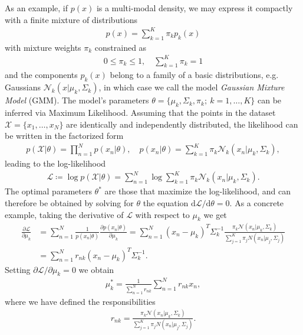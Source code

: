 As an example, if $p(x)$ is a multi-modal density, we may express it compactly with a finite mixture of  distributions
%
\begin{align}
p(x) = \sum_{k=1}^{K} \pi_{k} p_{k}(x)
\end{align}
%
with mixture weights $\pi_{k}$ constrained as
%
\begin{align}
0 \leq \pi_k \leq 1, \quad \sum_{k=1}^{K} \pi_{k} = 1
\end{align}
%
and the components $p_{k}(x)$ belong to a family of a basic distributions, e.g. Gaussians $\mathcal{N}_k(x | \mu_k, \Sigma_k)$, in which case we call the model \textit{Gaussian Mixture Model} (GMM). The model's parameters $\theta = \{ \mu_k, \Sigma_k, \pi_k; ~ k = 1, \ldots, K \}$ can be inferred via Maximum Likelihood. Assuming that the points in the dataset $\mathcal{X} = \{x_1, \ldots , x_N \}$ are identically and independently distributed, the likelihood can be written in the factorized form
%
\begin{align}
p(\mathcal{X} | \theta ) = \prod_{n=1}^N p(x_n | \theta), \quad p(x_n | \theta) = \sum_{k=1}^K \pi_k \mathcal{N}_k(x_n | \mu_k, \Sigma_k),
\end{align}
%
leading to the log-likelihood
%
\begin{align}
\mathcal{L} \coloneqq \log p(\mathcal{X} | \theta ) = \sum_{n=1}^N \log \sum_{k=1}^K \pi_k \mathcal{N}_k(x_n | \mu_k, \Sigma_k).
\end{align}
%
The optimal parameters $\theta^{*}$ are those that maximize the log-likelihood, and can therefore be obtained by solving for $\theta$ the equation $\text{d} \mathcal{L} / \text{d}\theta = 0$.
As a concrete example, taking the derivative of $\mathcal{L}$ with respect to $\mu_{k}$ we get
%
\begin{align}
\frac{\partial \mathcal{L}}{\partial \mu_k} &= \sum_{n=1}^{N} \frac{1}{p(x_n | \theta)} \frac{\partial p(x_n | \theta) }{\partial \mu_k} = \sum_{n=1}^{N} (x_n - \mu_k)^{T} \Sigma_k^{-1} \frac{\pi_k \mathcal{N}(x_n | \mu_k, \Sigma_k)}{\sum_{j=1}^{K} \pi_j N(x_n | \mu_j, \Sigma_j) } \\
&= \sum_{n=1}^{N} r_{nk} (x_n - \mu_k)^{T} \Sigma_k^{-1} .
\end{align}
%
Setting $\partial \mathcal{L} / \partial \mu_k  = 0$ we obtain
%
\begin{align}
\mu_k^{*} = \frac{1}{ \sum_{n=1}^{N} r_{nk}} \sum_{n=1}^{N} r_{nk} x_n,
\end{align}
%
where we have defined the responsibilities
%
\begin{align}
r_{nk} = \frac{\pi_k \mathcal{N}(x_n | \mu_k, \Sigma_k)}{\sum_{j=1}^{K} \pi_j N(x_n | \mu_j, \Sigma_j) }.
\end{align}
